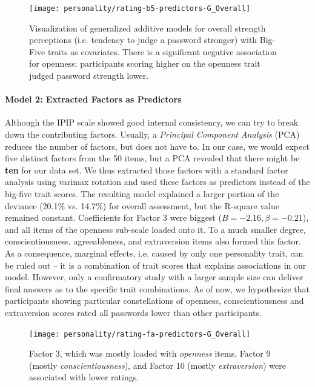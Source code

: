\begin{figure}[htbp]
	\centering
	\texttt{[image: personality/rating-b5-predictors-G\_Overall]}
	\caption{\label{fig:personality:study2:rating-b5-predictors-G_Overall}Visualization of generalized additive models for overall strength perceptions (i.e. tendency to judge a password stronger) with Big-Five traits as covariates. There is a significant negative association for openness: participants scoring higher on the openness trait judged password strength lower.}
\end{figure}


\paragraph{Model 2: Extracted Factors as Predictors}
Although the IPIP scale showed good internal consistency, we can try to break down the contributing factors. Usually, a \textit{Principal Component Analysis} (PCA) reduces the number of factors, but does not have to. In our case, we would expect five distinct factors from the 50 items, but a PCA revealed that there might be \textbf{ten} for our data set. We thus extracted those factors with a standard factor analysis using varimax rotation and used these factors as predictors instead of the big-five trait scores. The resulting model explained a larger portion of the deviance (20.1\% vs. 14.7\%) for overall assessment, but the R-square value remained constant. Coefficients for Factor 3 were biggest ($B=-2.16, \beta=-0.21$), and all items of the openness sub-scale loaded onto it. To a much smaller degree, conscientiousness, agreeableness, and extraversion items also formed this factor. As a consequence, marginal effects, i.e. caused by only one personality trait, can be ruled out -- it is a combination of trait scores that explains associations in our model. However, only a confirmatory study with a larger sample size can deliver final answers as to the specific trait combinations. As of now, we hypothesize that participants showing particular constellations of openness, conscientiousness and extraversion scores rated all passwords lower than other participants.
\begin{figure}[htbp]
	\centering
	\texttt{[image: personality/rating-fa-predictors-G\_Overall]}
	\caption{\label{fig:personality:study2:rating-fa-predictors-G_Overall}Factor 3, which was mostly loaded with \textit{openness} items, Factor 9 (mostly \textit{conscientiousness}), and Factor 10 (mostly \textit{extraversion}) were associated with lower ratings.}
\end{figure}

